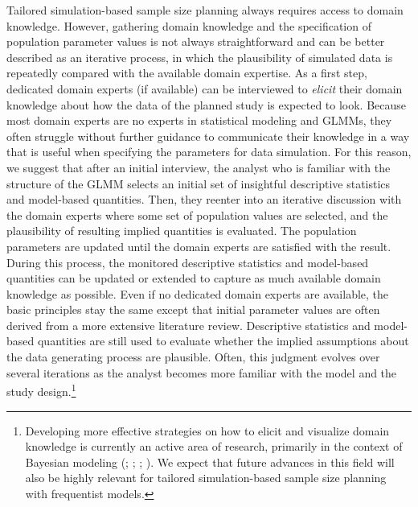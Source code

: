 \documentclass[
  man,
  floatsintext,
  longtable,
  a4paper,
  nolmodern,
  notxfonts,
  notimes,
  colorlinks=true,linkcolor=blue,citecolor=blue,urlcolor=blue]{apa7}
\begin{document}
Tailored simulation-based sample size planning always requires access to
domain knowledge. However, gathering domain knowledge and the
specification of population parameter values is not always
straightforward and can be better described as an iterative process, in
which the plausibility of simulated data is repeatedly compared with the
available domain expertise. As a first step, dedicated domain experts
(if available) can be interviewed to \emph{elicit} their domain
knowledge about how the data of the planned study is expected to look.
Because most domain experts are no experts in statistical modeling and
GLMMs, they often struggle without further guidance to communicate their
knowledge in a way that is useful when specifying the parameters for
data simulation. For this reason, we suggest that after an initial
interview, the analyst who is familiar with the structure of the GLMM
selects an initial set of insightful descriptive statistics and
model-based quantities. Then, they reenter into an iterative discussion
with the domain experts where some set of population values are
selected, and the plausibility of resulting implied quantities is
evaluated. The population parameters are updated until the domain
experts are satisfied with the result. During this process, the
monitored descriptive statistics and model-based quantities can be
updated or extended to capture as much available domain knowledge as
possible. Even if no dedicated domain experts are available, the basic
principles stay the same except that initial parameter values are often
derived from a more extensive literature review. Descriptive statistics
and model-based quantities are still used to evaluate whether the
implied assumptions about the data generating process are plausible.
Often, this judgment evolves over several iterations as the analyst
becomes more familiar with the model and the study design.\footnote{Developing
  more effective strategies on how to elicit and visualize domain
  knowledge is currently an active area of research, primarily in the
  context of Bayesian modeling
  (;
  ; ;
  ). We expect that future advances in this field will also be
  highly relevant for tailored simulation-based sample size planning
  with frequentist models.}
\end{document}
